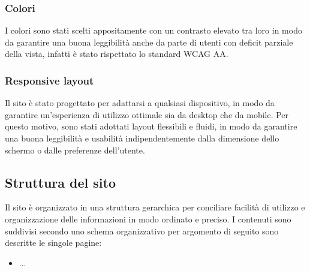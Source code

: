 \subsubsection{Colori}

I colori sono stati scelti appositamente con un contrasto elevato tra loro in
modo da garantire una buona leggibilità anche da parte di utenti con deficit
parziale della vista, infatti è stato rispettato lo standard WCAG AA.

\subsubsection{Responsive layout}

Il sito è stato progettato per adattarsi a qualsiasi dispositivo, in modo da
garantire un'esperienza di utilizzo ottimale sia da desktop che da mobile. Per
questo motivo, sono stati adottati layout flessibili e fluidi, in modo da
garantire una buona leggibilità e usabilità indipendentemente dalla dimensione
dello schermo o dalle preferenze dell'utente.

\subsection{Struttura del sito}

Il sito è organizzato in una struttura gerarchica per conciliare facilità di
utilizzo e organizzazione delle informazioni in modo ordinato e preciso. I
contenuti sono suddivisi secondo uno schema organizzativo per argomento di
seguito sono descritte le singole pagine:

\begin{itemize}
    \item ...
\end{itemize}

